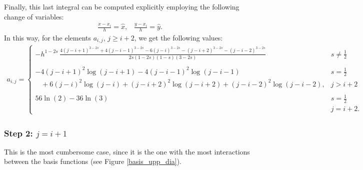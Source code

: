 Finally, this last integral can be computed explicitly employing the following  change of variables:
\begin{align}\label{cv}
	\frac{x-x_i}{h}=\hat{x},\;\;\; \frac{y-x_i}{h}=\hat{y}.
\end{align}
In this way, for the elements $a_{i,j}$, $j\geq i+2$, we get the following values: 
\begin{align*}
	a_{i,j} = \begin{cases}
			\displaystyle -h^{1-2s}\,\frac{4(j-i+1)^{3-2s} + 4(j-i-1)^{3-2s}-6(j-i)^{3-2s}-(j-i+2)^{3-2s}-(j-i-2)^{3-2s}}{2s(1-2s)(1-s)(3-2s)} & \displaystyle s\neq\frac{1}{2} 
			\\
			\\
			-4(j-i+1)^2\log(j-i+1)-4(j-i-1)^2\log(j-i-1) &  \displaystyle s=\frac{1}{2}
			\\
			\;\;\;+6(j-i)^2\log(j-i)+(j-i+2)^2\log(j-i+2)+(j-i-2)^2\log(j-i-2), &  \displaystyle j> i+2
			\\
			\\
			56\ln(2)-36\ln(3) & \displaystyle s=\frac{1}{2}
			\\
			& \displaystyle j= i+2.
		\end{cases}	
\end{align*}

\subsubsection*{Step 2: $j= i+1$}
This is the most cumbersome case, since it is the one with the most interactions between the basis functions (see Figure \ref{basis_upp_dia}). 

